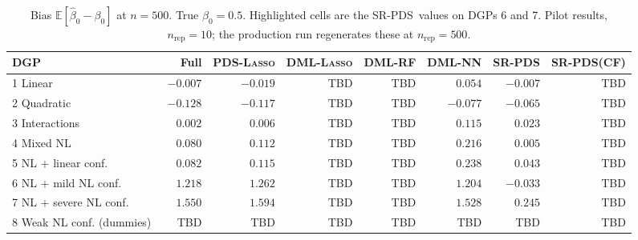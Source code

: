 \documentclass[11pt, a4paper]{article}
\theoremstyle{plain}
\theoremstyle{definition}
\theoremstyle{remark}
\newcommand{\hl}[1]{\cellcolor{highlight}#1}
\newcommand{\lasso}{\textsc{Lasso}}
\newcommand{\pds}{\textsc{PDS}}
\newcommand{\dml}{\textsc{DML}}
\newcommand{\epds}{\textsc{SR-PDS}}
\newcommand{\E}{\mathbb{E}}
\newcommand{\betahat}{\hat{\beta}_0}
\begin{document}
\begin{table}[H]
\centering
\caption{Bias $\E[\betahat - \beta_0]$ at $n=500$. True $\beta_0
= 0.5$. Highlighted cells are the \epds\ values on
DGPs 6 and 7. Pilot results, $n_{\text{rep}} = 10$; the
production run regenerates these at $n_{\text{rep}} = 500$.}
\label{tab:bias}
\small
\setlength{\tabcolsep}{4pt}
\begin{tabular}{lrrrrrrr}
    \toprule
    DGP
        & Full
        & \pds-\lasso
        & \dml-\lasso
        & \dml-RF
        & \dml-NN
        & \epds
        & \epds (CF) \\
    \midrule
    1 Linear
        & $-0.007$ & $-0.019$ & {\small TBD} & {\small TBD} & $\phantom{-}0.054$ & $-0.007$ & {\small TBD} \\
    2 Quadratic
        & $-0.128$ & $-0.117$ & {\small TBD} & {\small TBD} & $-0.077$ & $-0.065$ & {\small TBD} \\
    3 Interactions
        & $\phantom{-}0.002$ & $\phantom{-}0.006$ & {\small TBD} & {\small TBD} & $\phantom{-}0.115$ & $\phantom{-}0.023$ & {\small TBD} \\
    4 Mixed NL
        & $\phantom{-}0.080$ & $\phantom{-}0.112$ & {\small TBD} & {\small TBD} & $\phantom{-}0.216$ & $\phantom{-}0.005$ & {\small TBD} \\
    5 NL + linear conf.
        & $\phantom{-}0.082$ & $\phantom{-}0.115$ & {\small TBD} & {\small TBD} & $\phantom{-}0.238$ & $\phantom{-}0.043$ & {\small TBD} \\
    6 NL + mild NL conf.
        & $\phantom{-}1.218$ & $\phantom{-}1.262$ & {\small TBD} & {\small TBD} & $\phantom{-}1.204$ & \hl{$-0.033$} & {\small TBD} \\
    7 NL + severe NL conf.
        & $\phantom{-}1.550$ & $\phantom{-}1.594$ & {\small TBD} & {\small TBD} & $\phantom{-}1.528$ & \hl{$\phantom{-}0.245$} & {\small TBD} \\
    8 Weak NL conf. (dummies)
        & {\small TBD} & {\small TBD} & {\small TBD} & {\small TBD} & {\small TBD} & {\small TBD} & {\small TBD} \\
    \bottomrule
\end{tabular}
\end{table}
\end{document}
